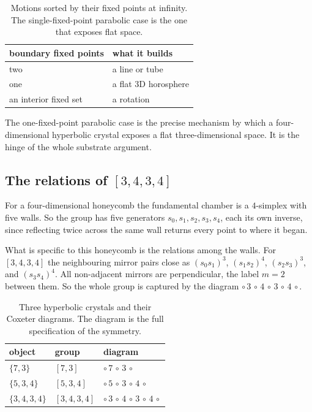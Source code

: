\begin{table}[ht]
\centering
\begin{tabular}{@{}ll@{}}
\toprule
boundary fixed points & what it builds \\
\midrule
two & a line or tube \\
one & a flat $3$D horosphere \\
an interior fixed set & a rotation \\
\bottomrule
\end{tabular}
\caption{Motions sorted by their fixed points at infinity. The single-fixed-point parabolic case is the one that exposes flat space.}
\label{tab:boundary-fixed}
\end{table}

The one-fixed-point parabolic case is the precise mechanism by which a four-dimensional hyperbolic crystal exposes a flat three-dimensional space. It is the hinge of the whole substrate argument.

\subsection{The relations of $[3,4,3,4]$}

For a four-dimensional honeycomb the fundamental chamber is a $4$-simplex with five walls. So the group has five generators $s_0, s_1, s_2, s_3, s_4$, each its own inverse, since reflecting twice across the same wall returns every point to where it began.

What is specific to this honeycomb is the relations among the walls. For $[3,4,3,4]$ the neighbouring mirror pairs close as $(s_0 s_1)^3$, $(s_1 s_2)^4$, $(s_2 s_3)^3$, and $(s_3 s_4)^4$. All non-adjacent mirrors are perpendicular, the label $m = 2$ between them. So the whole group is captured by the diagram $\circ\,3\,\circ\,4\,\circ\,3\,\circ\,4\,\circ$.

\begin{table}[ht]
\centering
\begin{tabular}{@{}lll@{}}
\toprule
object & group & diagram \\
\midrule
$\{7,3\}$ & $[7,3]$ & $\circ\,7\,\circ\,3\,\circ$ \\
$\{5,3,4\}$ & $[5,3,4]$ & $\circ\,5\,\circ\,3\,\circ\,4\,\circ$ \\
$\{3,4,3,4\}$ & $[3,4,3,4]$ & $\circ\,3\,\circ\,4\,\circ\,3\,\circ\,4\,\circ$ \\
\bottomrule
\end{tabular}
\caption{Three hyperbolic crystals and their Coxeter diagrams. The diagram is the full specification of the symmetry.}
\label{tab:diagrams}
\end{table}

